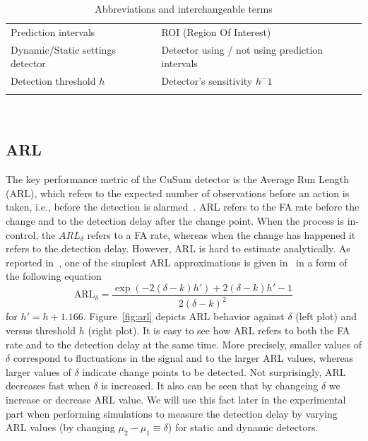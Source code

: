 \begin{table}[!htb]
	\begin{tabular}{| l | l |}
		\hline\noalign{\smallskip}
    Prediction intervals & ROI (Region Of Interest) \\
    Dynamic/Static settings detector & Detector using / not using prediction intervals \\
    Detection threshold $h$  & Detector's sensitivity $h^-1$ \\
		\noalign{\smallskip}\hline
	\end{tabular}
	\caption{Abbreviations and interchangeable terms}~\label{tab:interchangeable}
\end{table}

\subsection{ARL}
The key performance metric of the CuSum detector is the Average Run Length (ARL), which refers to the expected number of observations before an action is taken, i.e., before the detection is alarmed~\cite{Page1954}.
ARL refers to the FA rate before the change and to the detection delay after the change point.
When the process is in-control, the $ARL_{\delta}$ refers to a FA rate, whereas when the change has happened it refers to the detection delay.
However, ARL is hard to estimate analytically.
As reported in~\cite{plasse2021streaming}, one of the simplest ARL approximations is given in~\cite{siegmund2013sequential} in a form of the following equation %
\begin{equation}\label{eq:arl_approximation}
	\text{ARL}_{\delta} = \frac{\exp(-2(\delta-k)h') + 2(\delta - k)h' -1}{2 (\delta - k)^2}
\end{equation}
for $h' = h+1.166$.
Figure~\ref{fig:arl} depicts ARL behavior against $\delta$ (left plot) and versus threshold $h$ (right plot).
It is easy to see how ARL refers to both the FA rate and to the detection delay at the same time.
More precisely, smaller values of $\delta$ correspond to fluctuations in the signal and to the larger ARL values, whereas
larger values of $\delta$ indicate change points to be detected.
Not surprisingly, ARL decreases fast when $\delta$ is increased.
It also can be seen that by changeing $\delta$ we increase or decrease ARL value.
We will use this fact later in the experimental part when performing simulations to measure the detection delay by varying ARL values (by changing $\mu_2-\mu_1 \equiv \delta$) for static and dynamic detectors.
